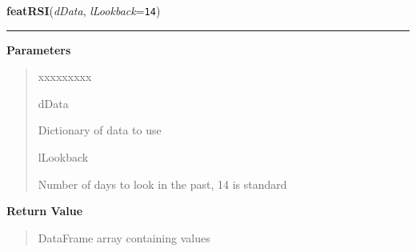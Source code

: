 \hspace{.8\funcindent}\begin{boxedminipage}{\funcwidth}

    \raggedright \textbf{featRSI}(\textit{dData}, \textit{lLookback}={\tt 14})

    \vspace{-1.5ex}

    \rule{\textwidth}{0.5\fboxrule}
\setlength{\parskip}{2ex}
\setlength{\parskip}{1ex}
      \textbf{Parameters}
      \vspace{-1ex}

      \begin{quote}
        \begin{Ventry}{xxxxxxxxx}

          \item[dData]

          Dictionary of data to use

          \item[lLookback]

          Number of days to look in the past, 14 is standard

        \end{Ventry}

      \end{quote}

      \textbf{Return Value}
    \vspace{-1ex}

      \begin{quote}
      DataFrame array containing values

      \end{quote}

    \end{boxedminipage}

    \label{QSTK:qstkfeat:features:featDrawDown}

    \vspace{0.5ex}

